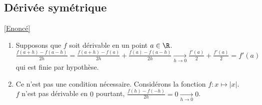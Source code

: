 \documentclass{book}
\begin{document}
	\subsection{Dérivée symétrique }
	\label{sec:derivee-symetrique-etoile1}
	\textcolor{blue}{\hyperref[deriveesymetrique]{[Enoncé]}}\\
	\begin{enumerate}[leftmargin=*]
		\item Supposons que $f$ soit dérivable en un point $a\in \R$.\\
		$\displaystyle\frac{f(a+h)-f(a-h)}{2h}=\frac{f(a+h)-f(a)}{2h}+\frac{f(a)-f(a-h)}{2h}\underset{h\to 0}{\longrightarrow}\frac{f'(a)}{2}+\frac{f'(a)}{2}=f'(a)$ qui est finie par hypothèse.
		\item Ce n'est pas une condition nécessaire. Considérons la fonction $f:x\mapsto |x|$.\\
		$f$ n'est pas dérivable en $0$ pourtant, $\displaystyle\frac{f(h)-f(-h)}{2h}=0\underset{h\to 0}{\longrightarrow}0$.
	\end{enumerate}
	
\end{document}
